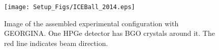 \begin{figure}
    \centering
    \texttt{[image: Setup\_Figs/ICEBall\_2014.eps]}
    \caption[Experimental setup with GEORGINA detectors]{Image of the assembled experimental configuration with GEORGINA. One HPGe detector has BGO crystals around it. The red line indicates beam direction.}
    \label{fig:georgina_config}
\end{figure}